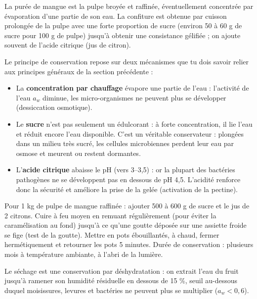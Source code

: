 \documentclass[11pt]{article}
\newcommand{\cle}[1]{{\popxbold\color{popdark}#1}}
\newcounter{popsec}
\newcounter{popsub}
\newcommand{\courssub}[1]{%
  \stepcounter{popsub}%
  \par\vspace{9pt}\noindent{\popxbold\fontsize{11.5}{13}\selectfont\color{popink}{\color{poporange}\thepopsec.\thepopsub}\hspace{6pt}#1}\par\nopagebreak\vspace{4pt}
}
\begin{document}
\begin{definition}
La \cle{purée} de mangue est la pulpe broyée et raffinée, éventuellement concentrée par évaporation d'une partie de son eau. La \cle{confiture} est obtenue par cuisson prolongée de la pulpe avec une forte proportion de \cle{sucre} (environ 50 à 60 g de sucre pour 100 g de pulpe) jusqu'à obtenir une consistance gélifiée ; on ajoute souvent de l'\cle{acide citrique} (jus de citron).
\end{definition}

Le principe de conservation repose sur deux mécanismes que tu dois savoir relier aux principes généraux de la section précédente :

\begin{itemize}
\item La \textbf{concentration par chauffage} évapore une partie de l'eau : l'activité de l'eau $a_w$ diminue, les micro-organismes ne peuvent plus se développer (dessiccation osmotique).
\item Le \textbf{sucre} n'est pas seulement un édulcorant : à forte concentration, il lie l'eau et réduit encore l'eau disponible. C'est un véritable \cle{conservateur} : plongées dans un milieu très sucré, les cellules microbiennes perdent leur eau par osmose et meurent ou restent dormantes.
\item L'\textbf{acide citrique} abaisse le \cle{pH} (vers 3--3,5) : or la plupart des bactéries pathogènes ne se développent pas en dessous de pH 4,5. L'acidité renforce donc la sécurité et améliore la prise de la gelée (activation de la pectine).
\end{itemize}

\begin{exemplebox}
Pour 1 kg de pulpe de mangue raffinée : ajouter 500 à 600 g de sucre et le jus de 2 citrons. Cuire à feu moyen en remuant régulièrement (pour éviter la caramélisation au fond) jusqu'à ce qu'une goutte déposée sur une assiette froide se fige (test de la goutte). Mettre en pots ébouillantés, à chaud, fermer hermétiquement et retourner les pots 5 minutes. Durée de conservation : plusieurs mois à température ambiante, à l'abri de la lumière.
\end{exemplebox}

\courssub{Fabrication de la mangue séchée}

\begin{definition}[Séchage]
Le \cle{séchage} est une conservation par déshydratation : on extrait l'eau du fruit jusqu'à ramener son humidité résiduelle en dessous de 15 \%, seuil au-dessous duquel moisissures, levures et bactéries ne peuvent plus se multiplier ($a_w < 0,6$).
\end{definition}
\end{document}
